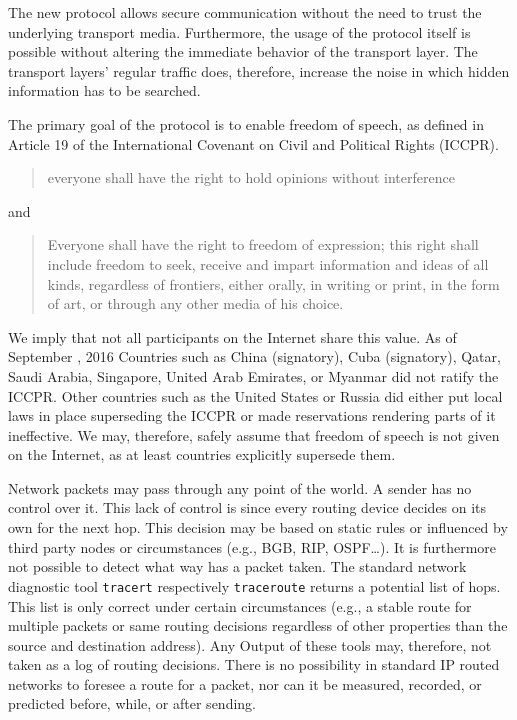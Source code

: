 The new protocol allows secure communication without the need to trust the underlying transport media. Furthermore, the usage of the protocol itself is possible without altering the immediate behavior of the transport layer. The transport layers' regular traffic does, therefore, increase the noise in which hidden information has to be searched. 

The primary goal of the protocol is to enable freedom of speech, as defined in Article 19 of the International Covenant on Civil and Political Rights (ICCPR)\cite{iccpr}.
\begin{quote}
	everyone shall have the right to hold opinions without interference 
\end{quote}
and
\begin{quote}
	Everyone shall have the right to freedom of expression; this right shall include freedom to seek, receive and impart information and ideas of all kinds, regardless of frontiers, either orally, in writing or print, in the form of art, or through any other media of his choice.
\end{quote}

We imply that not all participants on the Internet share this value. As of September , 2016 Countries such as China (signatory), Cuba (signatory), Qatar, Saudi Arabia, Singapore, United Arab Emirates, or Myanmar did not ratify the ICCPR. Other countries such as the United States or Russia did either put local laws in place superseding the ICCPR or made reservations rendering parts of it ineffective. We may, therefore, safely assume that freedom of speech is not given on the Internet, as at least countries explicitly supersede them.

Network packets may pass through any point of the world. A sender has no control over it. This lack of control is since every routing device decides on its own for the next hop. This decision may be based on static rules or influenced by third party nodes or circumstances (e.g., BGB, RIP, OSPF\ldots). It is furthermore not possible to detect what way has a packet taken. The standard network diagnostic tool \verb|tracert| respectively \verb|traceroute| returns a potential list of hops. This list is only correct under certain circumstances (e.g., a stable route for multiple packets or same routing decisions regardless of other properties than the source and destination address). Any Output of these tools may, therefore, not taken as a log of routing decisions. There is no possibility in standard IP routed networks to foresee a route for a packet, nor can it be measured, recorded, or predicted before, while, or after sending. 

